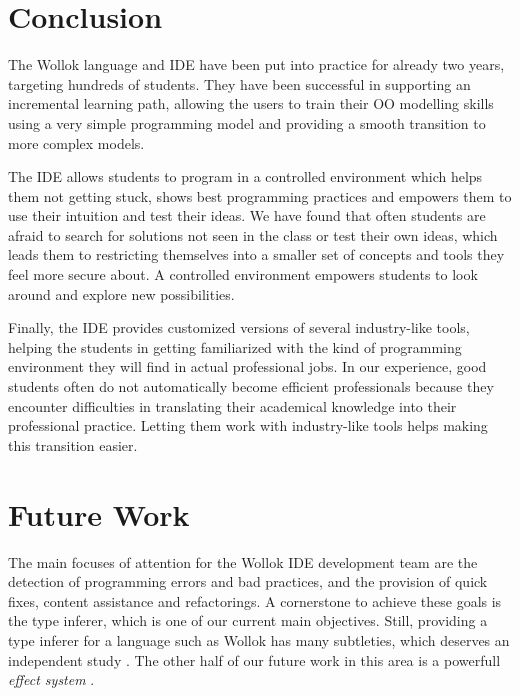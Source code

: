 \section{Conclusion}
\label{sec:conclusion}


The Wollok language and IDE have been put into practice for already two years, targeting hundreds of students.
They have been successful in supporting an incremental learning path, allowing the users to train their OO modelling skills using a very simple programming model and providing a smooth transition to more complex models.


The IDE allows students to program in a controlled environment which helps them not getting stuck, shows best programming practices and empowers them to use their intuition and test their ideas.
We have found that often students are afraid to search for solutions not seen in the class or test their own ideas, 
which leads them to restricting themselves into a smaller set of concepts and tools they feel more secure about.
A controlled environment empowers students to look around and explore new possibilities.

Finally, the IDE provides customized versions of several industry-like tools, helping the students in getting familiarized with the kind of programming environment they will find in actual professional jobs.
In our experience, good students often do not automatically become efficient professionals because they encounter difficulties in translating their academical knowledge into their professional practice.
Letting them work with industry-like tools helps making this transition easier.

\section{Future Work}
\label{sec:furtherWork}
The main focuses of attention for the Wollok IDE development team are the detection of programming errors and bad practices, and the provision of quick fixes, content assistance and refactorings.
A cornerstone to achieve these goals is the type inferer, which is one of our current main objectives.
Still, providing a type inferer for a language such as Wollok has many subtleties, which deserves an independent study \cite{passerini_nicolas_extensible_2014}.
The other half of our future work in this area is a powerfull \emph{effect system} \cite{nielson_type_1999}.

